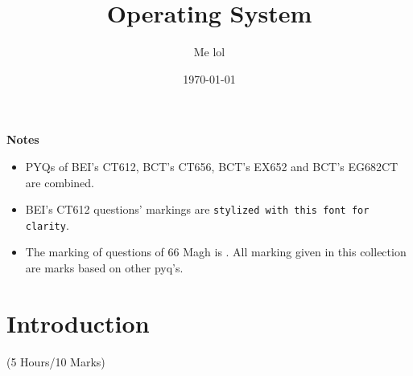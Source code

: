 \documentclass[12pt]{article}
\title{Operating System}
\author{Me lol}
\date{\today}
\begin{document}
\maketitle
\vspace{13cm}
\begin{large}\textbf{Notes}\end{large}
\begin{itemize}
\item PYQs of BEI's CT612, BCT's CT656, BCT's EX652 and BCT's EG682CT are combined.
\item BEI's CT612 questions' markings are \texttt{stylized with this font for clarity}.
\item The marking of questions of 66 Magh is  . All marking given in this collection are  marks based on other pyq's. 
\end{itemize}
\pagebreak
\tableofcontents
\pagebreak

\section{Introduction}
	\begin{center}(5 Hours/10 Marks)\end{center}
\end{document}
